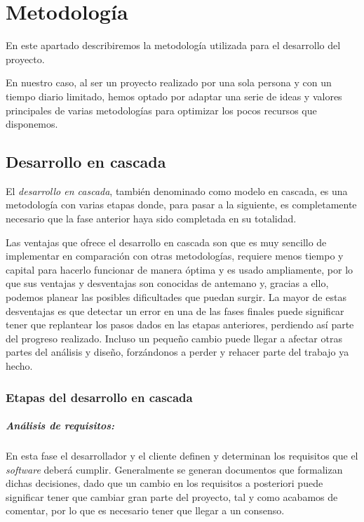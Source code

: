 \chapter{Metodología}

En este apartado describiremos la metodología utilizada para el desarrollo del proyecto.

En nuestro caso, al ser un proyecto realizado por una sola persona y con un tiempo diario limitado, hemos optado por adaptar una serie de ideas y valores principales de varias metodologías para optimizar los pocos recursos que disponemos.

\section{Desarrollo en cascada}

El \textit{desarrollo en cascada}, también denominado como modelo en cascada, es una metodología con varias etapas donde, para pasar a la siguiente, es completamente necesario que la fase anterior haya sido completada en su totalidad.

Las ventajas que ofrece el desarrollo en cascada son que es muy sencillo de implementar en comparación con otras metodologías, requiere menos tiempo y capital para hacerlo funcionar de manera óptima y es usado ampliamente, por lo que sus ventajas y desventajas son conocidas de antemano y, gracias a ello, podemos planear las posibles dificultades que puedan surgir. La mayor de estas desventajas es que detectar un error en una de las fases finales puede significar tener que replantear los pasos dados en las etapas anteriores, perdiendo así parte del progreso realizado. Incluso un pequeño cambio puede llegar a afectar otras partes del análisis y diseño, forzándonos a perder y rehacer parte del trabajo ya hecho. 

\subsection{Etapas del desarrollo en cascada}

\paragraph{Análisis de requisitos:}

En esta fase el desarrollador y el cliente definen y determinan los requisitos que el \textit{software} deberá cumplir. Generalmente se generan documentos que formalizan dichas decisiones, dado que un cambio en los requisitos a posteriori puede significar tener que cambiar gran parte del proyecto, tal y como acabamos de comentar, por lo que es necesario tener que llegar a un consenso.


